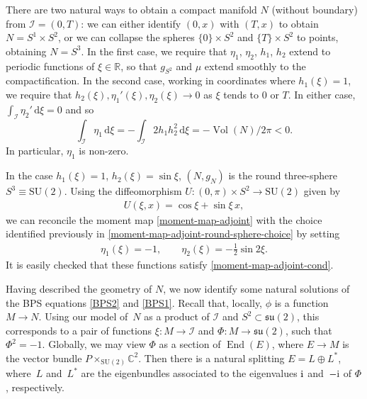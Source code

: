 \documentclass[pdftex]{sigma}
\newcommand{\II}{{\mathcal{I}}}
\newcommand{\su}{{\mathfrak{su}}}
\newcommand{\SU}{{\mathrm{SU}}}
\newcommand{\R}{{\mathbb{R}}}
\newcommand{\C}{{\mathbb{C}}}
\newcommand{\1}{{\mathbb{1}}}
\def \d{\mathrm{d}}
\numberwithin{equation}{section}
\begin{document}
There are two natural ways to obtain a compact manifold $N$ (without boundary) from \mbox{$\II=(0,T)$}: we can either identify $(0,x)$ with $(T,x)$ to obtain $N=S^1\times S^2$, or we can collapse the spheres $\{0\}\times S^2$ and $\{T\}\times S^2$ to points, obtaining $N=S^3$. In the first case, we require that $\eta_1$, $\eta_2$, $h_1$, $h_2$ extend to periodic functions of $\xi\in\R$, so that $g_{S^2}$ and $\mu$ extend smoothly to the compactification. In the second case, working in coordinates where $h_1(\xi)=1$, we require that $h_2(\xi), \eta_1'(\xi), \eta_2(\xi)\to 0$ as $\xi$ tends to $0$ or $T$. In either case, $\int_\II \eta_2'\,\d\xi=0$ and so
\begin{equation}\label{eta1 constraint}
\int_\II \eta_1\,\d\xi = -\int_\II 2 h_1h_2^2\,\d\xi=-\operatorname{Vol}(N)/2\pi<0.
\end{equation}
In particular, $\eta_1$ is non-zero.
\begin{Remark}
In the case $h_1(\xi)=1$, $h_2(\xi)=\sin\xi$, $(N,g_N)$ is the round three-sphere $S^3\equiv\SU(2)$. Using the diffeomorphism $U\colon (0,\pi)\times S^2\to\SU(2)$ given by
\begin{align*}
 U(\xi,x)=\cos\xi+\sin\xi\,x,
\end{align*}
we can reconcile the moment map \eqref{moment-map-adjoint} with the choice identified previously in \eqref{moment-map-adjoint-round-sphere-choice} by setting
\begin{align*}
 \eta_1(\xi)=-1,\qquad\eta_2(\xi)=-\tfrac{1}{2}\sin2\xi.
\end{align*}
It is easily checked that these functions satisfy \eqref{moment-map-adjoint-cond}.
\end{Remark}

Having described the geometry of $N$, we now identify some natural solutions of the BPS equations \eqref{BPS2} and \eqref{BPS1}. Recall that, locally, $\phi$ is a function $M\to N$. Using our model of~$N$ as a product of $\II$ and $S^2\subset \su(2)$, this corresponds to a pair of functions $\xi\colon M\to \II$ and $\Phi\colon M\to\su(2)$, such that $\Phi^2=-1$. Globally, we may view $\Phi$ as a section of $\operatorname{End}(E)$, where $E\to M$ is the vector bundle $P\times_{\SU(2)}\C^2$. Then there is a natural splitting $E=L\oplus L^\ast$, where~$L$ and~$L^\ast$ are the eigenbundles associated to the eigenvalues ${\rm i}$ and~$-{\rm i}$ of $\Phi$, respectively.
\end{document}
